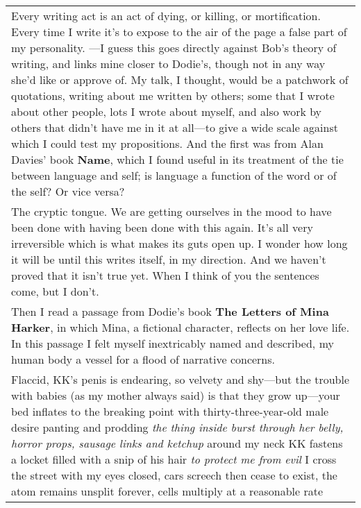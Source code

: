 \begin{longtable}[]{@{}l@{}}
\begin{minipage}[t]{0.97\columnwidth}
Every writing act is an act of dying, or killing, or mortification.
Every time I write it's to expose to the air of the page a false part of
my personality. ---I guess this goes directly against Bob's theory of
writing, and links mine closer to Dodie's, though not in any way she'd
like or approve of. My talk, I thought, would be a patchwork of
quotations, writing about me written by others; some that I wrote about
other people, lots I wrote about myself, and also work by others that
didn't have me in it at all---to give a wide scale against which I could
test my propositions. And the first was from Alan Davies' book
\textbf{Name}, which I found useful in its treatment of the tie between
language and self; is language a function of the word or of the self? Or
vice versa?\strut
\end{minipage}\tabularnewline
\begin{minipage}[t]{0.97\columnwidth}\raggedright
\textbar{} \textbar{} The cryptic tongue. \textbar{} We are getting
ourselves \textbar{} in the mood to have been \textbar{} done with
having been done \textbar{} with this again. \textbar{} It's all very
irreversible \textbar{} which is what \textbar{} makes its guts open up.
\textbar{} I wonder how long it will \textbar{} be until this writes
\textbar{} itself, in \textbar{} my direction. And we \textbar{} haven't
proved \textbar{} that it isn't true yet. \textbar{} When I think of you
\textbar{} the sentences come, \textbar{} but I don't. \textbar{}\strut
\end{minipage}\tabularnewline
\begin{minipage}[t]{0.97\columnwidth}\raggedright
Then I read a passage from Dodie's book \textbf{The Letters of Mina
Harker}, in which Mina, a fictional character, reflects on her love
life. In this passage I felt myself inextricably named and described, my
human body a vessel for a flood of narrative concerns.\strut
\end{minipage}\tabularnewline
\begin{minipage}[t]{0.97\columnwidth}\raggedright
Flaccid, KK's penis is endearing, so velvety and shy---but the trouble
with babies (as my mother always said) is that they grow up---your bed
inflates to the breaking point with thirty-three-year-old male desire
panting and prodding \emph{the thing inside burst through her belly,
horror props, sausage links and ketchup} around my neck KK fastens a
locket filled with a snip of his hair \emph{to protect me from evil} I
cross the street with my eyes closed, cars screech then cease to exist,
the atom remains unsplit forever, cells multiply at a reasonable rate

\end{minipage}
\end{longtable}
